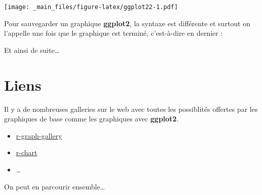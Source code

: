 \documentclass[
]{book}
\newenvironment{Shaded}{\begin{snugshade}}{\end{snugshade}}
\newcommand{\AttributeTok}[1]{\textcolor[rgb]{0.13,0.29,0.53}{#1}}
\newcommand{\FunctionTok}[1]{\textcolor[rgb]{0.13,0.29,0.53}{\textbf{#1}}}
\newcommand{\NormalTok}[1]{#1}
\newcommand{\OtherTok}[1]{\textcolor[rgb]{0.56,0.35,0.01}{#1}}
\newcommand{\SpecialCharTok}[1]{\textcolor[rgb]{0.81,0.36,0.00}{\textbf{#1}}}
\newcommand{\StringTok}[1]{\textcolor[rgb]{0.31,0.60,0.02}{#1}}
\providecommand{\tightlist}{%
  \setlength{\itemsep}{0pt}\setlength{\parskip}{0pt}}
\begin{document}
\begin{Shaded}
\end{Shaded}

\texttt{[image: \_main\_files/figure-latex/ggplot22-1.pdf]}

Pour sauvegarder un graphique \textbf{ggplot2}, la syntaxe est différente et surtout
on l'appelle une fois que le graphique est terminé, c'est-à-dire en dernier :

Et ainsi de suite\ldots{}

\hypertarget{liens}{%
\section{Liens}\label{liens}}

Il y a de nombreuses galleries sur le web avec toutes les possiblités offertes
par les graphiques de base comme les graphiques avec \textbf{ggplot2}.

\begin{itemize}
\tightlist
\item
  \href{https://r-graph-gallery.com/}{r-graph-gallery}
\item
  \href{https://r-charts.com/ggplot2/}{r-chart}
\item
  \ldots{}
\end{itemize}

On peut en parcourir ensemble\ldots{}
\end{document}
